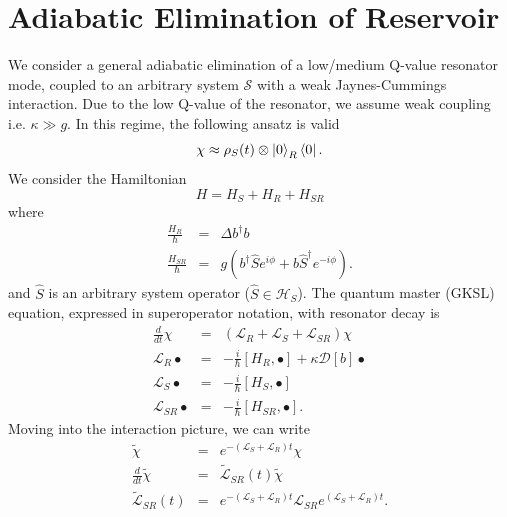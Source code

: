\section{Adiabatic Elimination of Reservoir}
%
We consider a general adiabatic elimination of a low/medium Q-value resonator mode, coupled to an arbitrary system $\mathcal{S}$ with a weak Jaynes-Cummings interaction. Due to the low Q-value of the resonator, we assume weak coupling i.e. $\kappa \gg g$. In this regime, the following ansatz is valid 
%
\begin{equation}\label{ansatz}
\chi \approx \rho_S(t) \otimes \left| 0 \right\rangle_R \left\langle 0 \right|.
\end{equation}
%
We consider the Hamiltonian
\begin{equation}
H=H_S + H_R + H_{SR}
\end{equation}
where
\begin{eqnarray}\label{D_AB}
\frac{H_R}{\hbar} & = & \Delta b^{\dagger} b \nonumber \\
\frac{H_{SR}}{\hbar} & = & g \left( b^{\dagger} \hat{S} e^{i \phi } + b \hat{S}^{\dagger} e^{-i \phi} \right). 
\end{eqnarray}
and $\hat{S}$ is an arbitrary system operator ($\hat{S} \in \mathcal{H}_S$). The quantum master (GKSL) equation, expressed in superoperator notation, with resonator decay is
\begin{eqnarray}\label{Schrodinger Superoperator}
\frac{d}{dt}\chi & = & \left( \mathcal{L}_R + \mathcal{L}_S + \mathcal{L}_{SR} \right) \chi
\nonumber \\
\mathcal{L}_R \bullet &=& - \frac{i}{\hbar} [ H_R , \bullet ] + \kappa \mathcal{D}[b]\bullet \nonumber \\
\mathcal{L}_S \bullet  &=& - \frac{i}{\hbar} [ H_S, \bullet ]  \nonumber \\
\mathcal{L}_{SR} \bullet & = & - \frac{i}{\hbar} [H_{SR} , \bullet ].
\end{eqnarray}
Moving into the interaction picture, we can write
\begin{eqnarray}\label{Eqn:Super_Interaction_Pic}
\tilde{\chi} &= &e^{-( \mathcal{L}_S + \mathcal{L}_R ) t } \chi \nonumber \\
\frac{d}{dt} \tilde{\chi} & = & \mathcal{\tilde{L}}_{SR}(t) \tilde{\chi} \nonumber \\
\mathcal{\tilde{L}}_{SR}(t) &= & e^{-( \mathcal{L}_S + \mathcal{L}_R ) t } \mathcal{L}_{SR} e^{( \mathcal{L}_S + \mathcal{L}_R ) t }.
\end{eqnarray}
